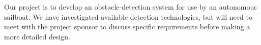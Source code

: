 Our project is to develop an obstacle-detection system for use by an autonomous sailboat.  We have investigated available detection technologies, but will need to meet with the project sponsor to discuss specific requirements before making a more detailed design.
